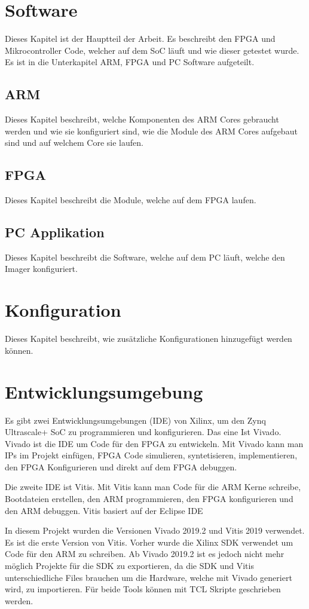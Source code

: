 \documentclass{article}
\begin{document}
\section{Software}
Dieses Kapitel ist der Hauptteil der Arbeit. Es beschreibt den FPGA und Mikrocontroller Code, welcher auf dem SoC läuft und wie dieser getestet wurde. Es ist in die Unterkapitel ARM, FPGA und PC Software aufgeteilt.
\subsection{ARM}
Dieses Kapitel beschreibt, welche Komponenten des ARM Cores gebraucht werden und wie sie konfiguriert sind, wie die Module des ARM Cores aufgebaut sind und auf welchem Core sie laufen.
\subsection{FPGA}
Dieses Kapitel beschreibt die Module, welche auf dem FPGA laufen.
\subsection{PC Applikation}
Dieses Kapitel beschreibt die Software, welche auf dem PC läuft, welche den Imager konfiguriert.


\section{Konfiguration}
Dieses Kapitel beschreibt, wie zusätzliche Konfigurationen hinzugefügt werden können.

\section{Entwicklungsumgebung}
Es gibt zwei Entwicklungsumgebungen (IDE) von Xilinx, um den Zynq Ultrascale+ SoC zu programmieren und konfigurieren. Das eine Ist Vivado. Vivado ist die IDE um Code für den FPGA zu entwickeln. Mit Vivado kann man IPs im Projekt einfügen, FPGA Code simulieren, syntetisieren, implementieren, den FPGA Konfigurieren und direkt auf dem FPGA debuggen.

Die zweite IDE ist Vitis. Mit Vitis kann man Code für die ARM Kerne schreibe, Bootdateien erstellen, den ARM programmieren, den FPGA konfigurieren und den ARM debuggen. Vitis basiert auf der Eclipse IDE

In diesem Projekt wurden die Versionen Vivado 2019.2 und Vitis 2019 verwendet. Es ist die erste Version von Vitis. Vorher wurde die Xilinx SDK verwendet um Code für den ARM zu schreiben. Ab Vivado 2019.2 ist es jedoch nicht mehr möglich Projekte für die SDK zu exportieren, da die SDK und Vitis unterschiedliche Files brauchen um die Hardware, welche mit Vivado generiert wird, zu importieren. Für beide Tools können mit TCL Skripte geschrieben werden.
\end{document}
